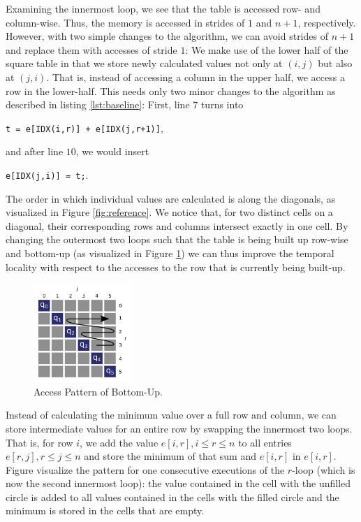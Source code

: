  Examining the innermost loop, we see that the table is
accessed row- and column-wise. Thus, the memory is accessed in strides of $1$
and $n+1$, respectively. However, with two simple changes to the algorithm, we
can avoid strides of $n+1$ and replace them with accesses of stride $1$: We make
use of the lower half of the square table in that we store newly calculated
values not only at $(i,j)$ but also at $(j,i)$. That is, instead of accessing a
column in the upper half, we access a row in the lower-half. This needs only two
minor changes to the algorithm as described in listing \ref{lst:baseline}:
First, line $7$ turns into
\begin{center}
\verb:t = e[IDX(i,r)] + e[IDX(j,r+1)]:, 
\end{center}
and after line $10$, we would insert 
\begin{center}
	\verb:e[IDX(j,i)] = t;:.
\end{center}
 The order in which individual values are calculated is along
the diagonals, as visualized in Figure \ref{fig:reference}. We notice that, for
two distinct cells on a diagonal, their corresponding rows and columns intersect
exactly in one cell. By changing the outermost two loops such that the table is
being built up row-wise and bottom-up (as visualized in Figure
\ref{fig:bottom-up}) we can thus
improve the temporal locality with respect to the accesses to the row that is
currently being built-up.

\begin{figure}[htb]\centering
	\includegraphics[width=0.33\textwidth]{img/bottom_up_access.png}
  \caption{Access Pattern of Bottom-Up.\label{fig:bottom-up}}
\end{figure}

 Instead of calculating the minimum value over a full row
and column, we can store intermediate values for an entire row by swapping the
innermost two loops. That is, for row $i$, we add the value $e[i,r], i\leq r\leq
n$ to all entries $e[r,j], r\leq j \leq n$ and store the minimum of that sum and
$e[i,r]$ in $e[i,r]$. Figure visualize the pattern for one
consecutive executions of the $r$-loop (which is now the second innermost loop):
the value contained in the cell with the unfilled circle is added to all values
contained in the cells with the filled circle and the minimum is stored in the
cells that are empty.

